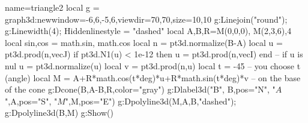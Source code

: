 \documentclass[12pt]{standalone}
\begin{document}
\begin{luadraw}{name=triangle2}
local g = graph3d:new{window={-6,6,-5,6},viewdir={70,70},size={10,10}}
g:Linejoin("round"); g:Linewidth(4); Hiddenlinestyle = "dashed"
local A,B,R=M(0,0,0), M(2,3,6),4
local sin,cos = math.sin, math.cos
local n = pt3d.normalize(B-A)
local u = pt3d.prod(n,vecJ)
if pt3d.N1(u) < 1e-12 then u = pt3d.prod(n,vecI) end -- if u is nul
u = pt3d.normalize(u)
local v = pt3d.prod(n,u)
local t = -45 -- you choose t (angle) 
local M = A+R*math.cos(t*deg)*u+R*math.sin(t*deg)*v -- on the base of the cone
g:Dcone(B,A-B,R,{color="gray"}) 
g:Dlabel3d("B", B,{pos="N"}, "$A$",A,{pos="S"}, "$M$",M,{pos="E"})
g:Dpolyline3d({M,A,B},"dashed"); g:Dpolyline3d({B,M})
g:Show()
\end{luadraw}
\end{document}
